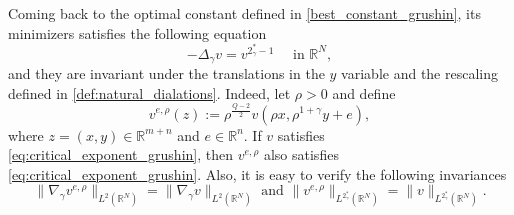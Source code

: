 \documentclass[11pt]{article}
\newcommand{\rnn}{\mathbb{R}^{N}}
\begin{document}

Coming back to the optimal constant defined in \eqref{best_constant_grushin}, its minimizers satisfies the following equation 
\begin{equation}\label{eq:critical_exponent_grushin}
-\Delta_\gamma v = v^{2_{\gamma}^*-1} \quad \text{ in } \rnn,
\end{equation}
and they are invariant under the translations in the $y$ variable and the rescaling defined in \eqref{def:natural_dialations}. Indeed, let $\rho > 0$ and define
\begin{equation*}
    v^{e,\rho}(z) := \rho^{\frac{Q-2}{2}} v(\rho x, \rho^{1+\gamma} y + e), 
\end{equation*}
where $z = (x, y) \in \mathbb{R}^{m+n}$ and $e \in \mathbb{R}^n$. If $v$ satisfies \eqref{eq:critical_exponent_grushin}, then $v^{e,\rho}$ also satisfies \eqref{eq:critical_exponent_grushin}. Also, it is easy to verify the following invariances
\begin{equation*}
    \|\nabla_\gamma v^{e,\rho}\|_{L^2(\mathbb{R}^N)} = \|\nabla_\gamma v\|_{L^2(\mathbb{R}^N)} \text{ and } \|v^{e,\rho}\|_{L^{2_\gamma^*}(\mathbb{R}^N)} = \|v\|_{L^{2_\gamma^*}(\mathbb{R}^N)}.
\end{equation*}

\end{document}
